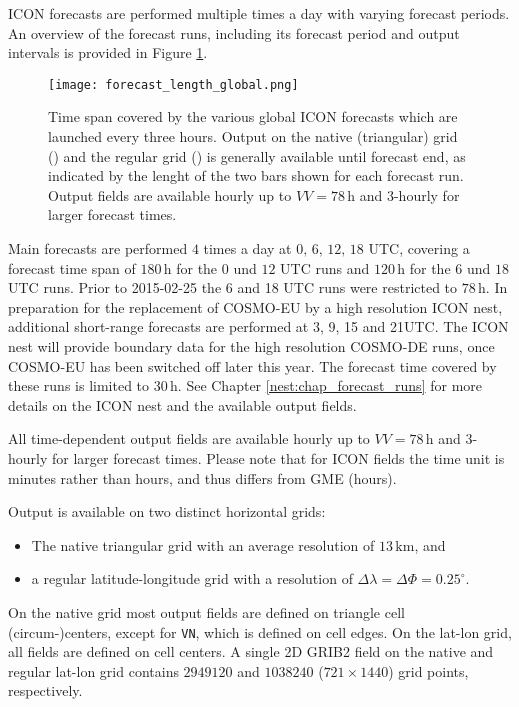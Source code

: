 ICON forecasts are performed multiple times a day with varying forecast periods. An overview of the forecast runs, including its  
forecast period and output intervals is provided in Figure \ref{fig:forecast_length_global}.
\begin{figure}[hbt]
 \centering
 \texttt{[image: forecast\_length\_global.png]}
 \caption{Time span covered by the various global ICON forecasts which are launched every three hours.
          Output on the native (triangular) grid (\protect\markRed) and the regular grid (\protect\markBlue) 
          is generally available until forecast end, as indicated by the lenght of the two bars shown for 
          each forecast run. Output fields are available hourly up to $VV=78\,\mathrm{h}$ and 3-hourly for 
          larger forecast times.}\label{fig:forecast_length_global}
\end{figure}

Main forecasts are performed $4$ times a day at $0,\, 6,\, 12,\, 18$ UTC, covering a forecast time span of $180\,\mathrm{h}$ for the 
$0$ und $12$ UTC runs and $120\,\mathrm{h}$ for the $6$ und $18$ UTC runs. Prior to 2015-02-25 the 6 and 18 UTC runs were restricted 
to $78\,\mathrm{h}$. In preparation for the replacement of COSMO-EU by a high resolution ICON nest, additional short-range forecasts 
are performed at 3, 9, 15 and 21UTC. The ICON nest will provide boundary data for the high resolution COSMO-DE runs, once COSMO-EU has 
been switched off later this year. The forecast time covered by these runs is limited to $30\,\mathrm{h}$. See Chapter 
\ref{nest:chap_forecast_runs} for more details on the ICON nest and the available output fields. 

All time-dependent output fields are available hourly up to
$VV=78\,\mathrm{h}$ and 3-hourly for larger forecast
times\footnotemark[2].
%
Please note that for ICON fields the time unit is minutes rather than
hours, and thus differs from GME (hours).

Output is available on two distinct horizontal grids: 
\begin{itemize}
  \item The native triangular grid with an average resolution of $13\,\mathrm{km}$, and
  \item a regular latitude-longitude grid with a resolution of $\Delta \lambda = \Delta \Phi=0.25^{\circ}$. 
\end{itemize}
On the native grid most output fields are defined on triangle cell
(circum-)centers, except for \texttt{VN}, which is defined on cell
edges. On the lat-lon grid, all fields are defined on cell centers.
%
A single 2D GRIB2 field on the native and regular lat-lon grid
contains $2949120$ and $1038240$ ($721 \times 1440$) grid points, respectively.


